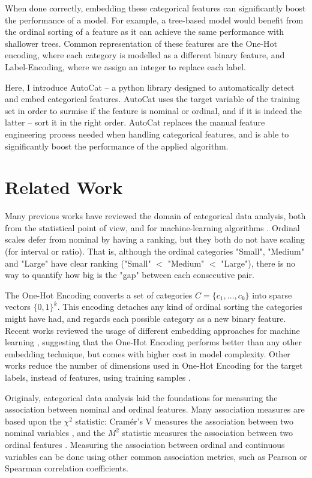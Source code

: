\documentclass{article}
\begin{document}
When done correctly, embedding these categorical features can significantly boost the performance of a model. For example, a tree-based model would benefit from the ordinal sorting of a feature as it can achieve the same performance with shallower trees. 
Common representation of these features are the One-Hot encoding, where each category is modelled as a different binary feature, and Label-Encoding, where we assign an integer to replace each label.

Here, I introduce AutoCat -- a python library designed to automatically detect and embed categorical features. AutoCat uses the target variable of the training set in order to surmise if the feature is nominal or ordinal, and if it is indeed the latter -- sort it in the right order. AutoCat replaces the manual feature engineering process needed when handling categorical features, and is able to significantly boost the performance of the applied algorithm.

\section{Related Work}
Many previous works have reviewed the domain of categorical data analysis, both from the statistical point of view, and for machine-learning algorithms \cite{agresti2018introduction, Stevens1946}. Ordinal scales defer from nominal by having a ranking, but they both do not have scaling (for interval or ratio). That is, although the ordinal categories "Small", "Medium" and "Large" have clear ranking ("Small" $<$ "Medium" $<$ "Large"), there is no way to quantify how big is the "gap" between each consecutive pair.

The One-Hot Encoding converts a set of categories $C = \{c_1, \dots, c_k\}$ into sparse vectors $\{0, 1\}^k$. This encoding detaches any kind of ordinal sorting the categories might have had, and regards each possible category as a new binary feature.
Recent works reviewed the usage of different embedding approaches for machine learning \cite{Potdar2017}, suggesting that the One-Hot Encoding performs better than any other embedding technique, but comes with higher cost in model complexity. 
Other works reduce the number of dimensions used in One-Hot Encoding for the target labels, instead of features, using training samples \cite{Rodrguez2018}.

Originaly, categorical data analysis laid the foundations for measuring the association between nominal and ordinal features. Many association measures are based upon the $\chi ^2$ statistic: Cramér's V measures the association between two nominal variables \cite{cramer1999mathematical}, and the $M^2$ statistic measures the association between two ordinal features \cite{agresti2007an}. Measuring the association between ordinal and continuous variables can be done using other common association metrics, such as Pearson or Spearman correlation coefficients. 
\end{document}
